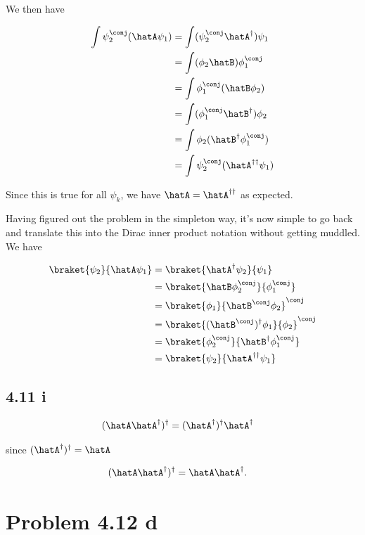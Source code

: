 We then have

\begin{align*}
\int \psi_2^\conj (\hatA \psi_1)
&=
\int (\psi_2^\conj \hatA^\dagger) \psi_1 \\
&=
\int (\phi_2 \hatB) \phi_1^\conj \\
&=
\int \phi_1^\conj (\hatB \phi_2) \\
&=
\int (\phi_1^\conj \hatB^\dagger) \phi_2 \\
&=
\int \phi_2 (\hatB^\dagger \phi_1^\conj) \\
&=
\int \psi_2^\conj (\hatA^{\dagger \dagger} \psi_1) \\
\end{align*}

Since this is true for all $\psi_k$, we have $\hatA = \hatA^{\dagger \dagger}$ as expected.

Having figured out the problem in the simpleton way, it's now simple to go back and translate this into the Dirac inner product notation without getting muddled.  We have

\begin{align*}
\braket{ \psi_2 }{ \hatA \psi_1 } 
&=
\braket{ \hatA^\dagger \psi_2 }{ \psi_1 }  \\
&=
\braket{ \hatB \phi_2^\conj }{ \phi_1^\conj }  \\
&=
{\braket{ \phi_1 }{ \hatB^\conj \phi_2}}^\conj  \\
&=
{\braket{ (\hatB^\conj)^\dagger \phi_1 }{ \phi_2}}^\conj  \\
&=
\braket{\phi_2^\conj }{ \hatB^\dagger \phi_1^\conj } \\
&=
\braket{\psi_2 }{ \hatA^{\dagger \dagger} \psi_1 } \\
\end{align*}

\subsection{ 4.11 i}

\begin{align*}
(\hatA \hatA^\dagger)^\dagger &= (\hatA^\dagger)^\dagger \hatA^\dagger 
\end{align*}

since $(\hatA^\dagger) ^\dagger = \hatA$

\begin{align*}
(\hatA \hatA^\dagger)^\dagger &= \hatA \hatA^\dagger.
\end{align*}

\section{Problem 4.12 d}

